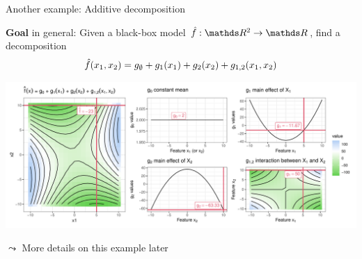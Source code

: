 \documentclass[10pt,compress,t,notes=noshow, xcolor=table]{beamer}
\newcommand{\open}{}
\newcommand{\close}{}
\begin{document}
\begin{frame}{Another example: Additive decomposition}

    \textbf{Goal} in general:
    Given a black-box model \(\fh: \R^2 \to \R\), find a decomposition
    \begin{equation}
        \fh(x_1, x_2) =  g_\emptyset + g_1(x_1) + g_2(x_2) + g_{\open 1, 2 \close}(x_1, x_2)
    \end{equation}
    

    \pause
    \begin{example}
    
    
    \includegraphics[width = \textwidth]{figure/decomposition}
    
    $\leadsto$ More details on this example later
        
    \end{example}
    
\end{frame}
\end{document}
